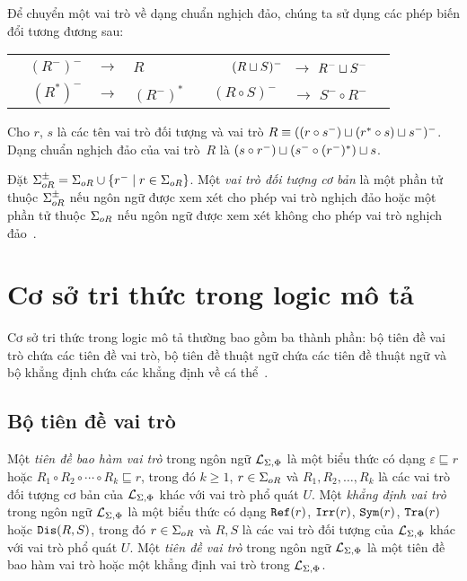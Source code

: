 Để chuyển một vai trò về dạng chuẩn nghịch đảo, chúng ta sử dụng các phép biến đổi tương đương sau:\\[1.0ex]
\begin{tabular}{c r c l  c r c l}
	& $(R^-)^-\!\!\!$ & $\longrightarrow$ & $\!\!\!R$ &\qquad\qquad\qquad\qquad\qquad\quad & $(R \sqcup S)^-\!\!\!$ & $\longrightarrow$ $R^- \sqcup S^-$ \\[0.5ex]	
	& $(R^*)^-\!\!\!$ & $\longrightarrow$ & $\!\!\!(R^-)^*$ &\qquad\qquad\quad & $(R \circ S)^-\!\!\!$ & $\longrightarrow$ $S^- \circ R^-$
\end{tabular}

\begin{Example}
	Cho $r$, $s$ là các tên vai trò đối tượng và vai trò $R \equiv ((r \circ s^-) \sqcup (r^* \circ s) \sqcup s^-)^-$. Dạng chuẩn nghịch đảo của vai trò~$R$ là $(s \circ r^-) \sqcup (s^- \circ (r^-)^*) \sqcup s$.\myend
\end{Example}

Đặt $\Sigma_{oR}^\pm = \Sigma_{oR} \cup \{r^- \mid r \in \Sigma_{oR}\}$. Một {\em vai trò đối tượng cơ bản} là một phần tử thuộc $\Sigma_{oR}^\pm$ nếu ngôn ngữ được xem xét cho phép vai trò nghịch đảo hoặc một phần tử thuộc $\Sigma_{oR}$ nếu ngôn ngữ được xem xét không cho phép vai trò nghịch đảo~\cite{Divroodi2011B}.

\section{Cơ sở tri thức trong logic mô tả}
\label{sec:Chap1.KnowledgeBaseInDL}
Cơ sở tri thức trong logic mô tả thường bao gồm ba thành phần: bộ tiên đề vai trò chứa các tiên đề vai trò, bộ tiên đề thuật ngữ chứa các tiên đề thuật ngữ và bộ khẳng định chứa các khẳng định về cá thể~\cite{DLHandbook2007,Divroodi2011B}.

\subsection{Bộ tiên đề vai trò}
\label{sec:Chap1.RBox}
\begin{Definition}
\label{def:RoleAxiom}
	Một {\em tiên đề bao hàm vai trò} trong ngôn ngữ $\mathcal{L}_{\Sigma,\Phi}$ là một biểu thức có dạng $\varepsilon \sqsubseteq r$ hoặc $R_1 \circ R_2 \circ \cdots \circ R_k \sqsubseteq r$, trong đó $k \geq 1$, $r \in \Sigma_{oR}$ và $R_1, R_2, \ldots,R_k$ là các vai trò đối tượng cơ bản của $\mathcal{L}_{\Sigma,\Phi}$ khác với vai trò phổ quát $U$. 
%
	Một {\em khẳng định vai trò} trong ngôn ngữ $\mathcal{L}_{\Sigma,\Phi}$ là một biểu thức có dạng $\mathtt{Ref}(r)$, $\mathtt{Irr}(r)$, $\mathtt{Sym}(r)$, $\mathtt{Tra}(r)$ hoặc $\mathtt{Dis}(R, S)$, trong đó $r \in \Sigma_{oR}$ và $R, S$ là các vai trò đối tượng của $\mathcal{L}_{\Sigma,\Phi}$ khác với vai trò phổ quát $U$.
%
	Một {\em tiên đề vai trò} trong ngôn ngữ $\mathcal{L}_{\Sigma,\Phi}$ là một tiên đề bao hàm vai trò hoặc một khẳng định vai trò trong $\mathcal{L}_{\Sigma,\Phi}$.\myend
\end{Definition}

